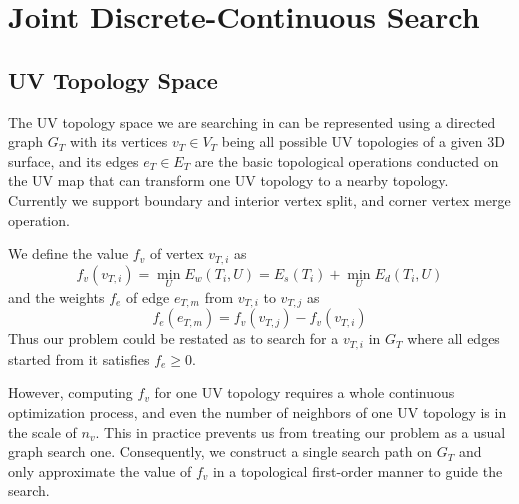 
\section{Joint Discrete-Continuous Search}

\subsection{UV Topology Space}

The UV topology space we are searching in can be represented using a directed graph $G_T$ with its vertices $v_T \in V_T$ being all possible UV topologies of a given 3D surface, and its edges $e_T \in E_T$ are the basic topological operations conducted on the UV map that can transform one UV topology to a nearby topology. Currently we support boundary and interior vertex split, and corner vertex merge operation.

We define the value $f_v$ of vertex $v_{T,i}$ as 
\[ f_v(v_{T,i}) = \min_{U} E_w(T_i, U) = E_s(T_i) + \min_{U} E_d(T_i, U) \]
and the weights $f_e$ of edge $e_{T,m}$ from $v_{T,i}$ to $v_{T,j}$ as 
\[ f_e(e_{T,m}) = f_v(v_{T,j}) - f_v(v_{T,i}) \]
Thus our problem could be restated as to search for a $v_{T,i}$ in $G_T$ where all edges started from it satisfies $f_e \geq 0$.

However, computing $f_v$ for one UV topology requires a whole continuous optimization process, and even the number of neighbors of one UV topology is in the scale of $n_v$. This in practice prevents us from treating our problem as a usual graph search one. Consequently, we construct a single search path on $G_T$ and only approximate the value of $f_v$ in a topological first-order manner to guide the search.



